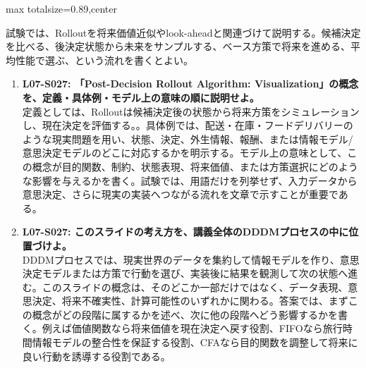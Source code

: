 \begin{minipage}[t]{0.58\textwidth}
\begin{adjustbox}{max totalsize={\textwidth}{0.89\textheight},center}
\begin{minipage}{\textwidth}
試験では、Rolloutを将来価値近似やlook-aheadと関連づけて説明する。候補決定を比べる、後決定状態から未来をサンプルする、ベース方策で将来を進める、平均性能で選ぶ、という流れを書くとよい。\par{}\begin{enumerate}\item \textbf{L07-S027: 「Post-Decision Rollout Algorithm: Visualization」の概念を、定義・具体例・モデル上の意味の順に説明せよ。}\\定義としては、Rolloutは候補決定後の状態から将来方策をシミュレーションし、現在決定を評価する。。具体例では、配送・在庫・フードデリバリーのような現実問題を用い、状態、決定、外生情報、報酬、または情報モデル/意思決定モデルのどこに対応するかを明示する。モデル上の意味として、この概念が目的関数、制約、状態表現、将来価値、または方策選択にどのような影響を与えるかを書く。試験では、用語だけを列挙せず、入力データから意思決定、さらに現実の実装へつながる流れを文章で示すことが重要である。\item \textbf{L07-S027: このスライドの考え方を、講義全体のDDDMプロセスの中に位置づけよ。}\\DDDMプロセスでは、現実世界のデータを集約して情報モデルを作り、意思決定モデルまたは方策で行動を選び、実装後に結果を観測して次の状態へ進む。このスライドの概念は、そのどこか一部だけではなく、データ表現、意思決定、将来不確実性、計算可能性のいずれかに関わる。答案では、まずこの概念がどの段階に属するかを述べ、次に他の段階へどう影響するかを書く。例えば価値関数なら将来価値を現在決定へ戻す役割、FIFOなら旅行時間情報モデルの整合性を保証する役割、CFAなら目的関数を調整して将来に良い行動を誘導する役割である。\end{enumerate}
\end{minipage}
\end{adjustbox}
\end{minipage}


